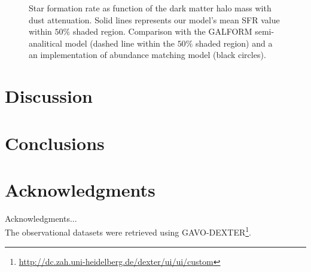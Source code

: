 \documentclass{emulateapj}
\begin{document}
\begin{figure}
\caption{Star formation rate as function of the dark matter halo mass with dust attenuation. 
Solid lines represents our model's mean SFR value within $50\%$  shaded region. 
Comparison with the GALFORM semi-analitical model \citep{Gonzalez14} (dashed line within the 
$50\%$ shaded region) and a an implementation of abundance matching model \citep{Behroozi13}
(black circles). }
\label{fig:_SFR_DMHM_w}
\end{figure}



\section{Discussion}
\label{sec:discussion}


\section{Conclusions}
\label{sec:conclusions}


\section*{Acknowledgments}
Acknowledgments...\\

The observational datasets were retrieved using
GAVO-DEXTER\footnote{\url{http://dc.zah.uni-heidelberg.de/dexter/ui/ui/custom}}. 



\end{document}
